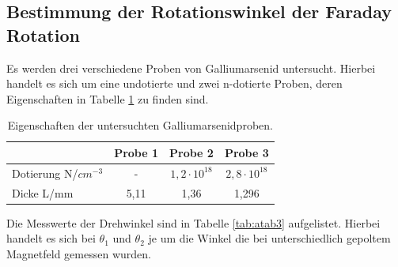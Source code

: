 \subsection{Bestimmung der Rotationswinkel der Faraday Rotation}
Es werden drei verschiedene Proben von Galliumarsenid untersucht. Hierbei handelt es sich um eine undotierte und zwei n-dotierte Proben, deren Eigenschaften in Tabelle \ref{tab:atab2} zu finden sind.

\FloatBarrier
\begin{table}[h]
    \centering
    \caption{Eigenschaften der untersuchten Galliumarsenidproben.}
    \label{tab:atab2}
    \begin{tabular}{l c c c}
        \toprule
        {} & {Probe 1} & {Probe 2} & {Probe 3} \\
        \midrule
        Dotierung N/$cm^{-3}$ & - & $1,2 \cdot 10^{18}$ & $2,8 \cdot 10^{18}$ \\
        Dicke L/mm & 5,11 & 1,36 & 1,296 \\
        \bottomrule
    \end{tabular}
\end{table}
\FloatBarrier
\noindent


Die Messwerte der Drehwinkel sind in Tabelle \ref{tab:atab3} aufgelistet. Hierbei handelt es sich bei $\theta_1$ und $\theta_2$ je um die Winkel die bei unterschiedlich gepoltem Magnetfeld gemessen wurden.

